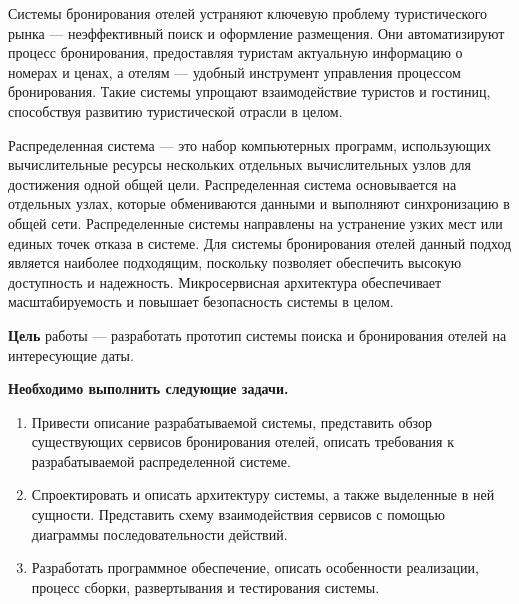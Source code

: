 {}
Системы бронирования отелей устраняют ключевую проблему туристического рынка --- неэффективный поиск и оформление размещения. Они
автоматизируют процесс бронирования, предоставляя туристам актуальную информацию о номерах и ценах, а отелям --- удобный инструмент управления
процессом бронирования. Такие системы упрощают взаимодействие туристов и гостиниц, способствуя развитию туристической отрасли в целом.

Распределенная система --- это набор компьютерных программ, использующих вычислительные ресурсы нескольких отдельных вычислительных узлов для достижения одной общей цели. Распределенная система основывается на отдельных узлах, которые обмениваются данными и выполняют синхронизацию в общей сети. Распределенные системы направлены на устранение узких мест или единых точек отказа в системе. Для системы бронирования отелей данный подход является наиболее подходящим, поскольку позволяет обеспечить высокую доступность и надежность. Микросервисная архитектура обеспечивает масштабируемость и повышает безопасность системы в целом.

\textbf{Цель} работы --- разработать прототип системы поиска и бронирования отелей на интересующие даты.

\textbf{Необходимо выполнить следующие задачи.}
\begin{enumerate}[topsep=0pt]
	\item Привести описание разрабатываемой системы, представить обзор существующих сервисов бронирования отелей, описать требования к разрабатываемой распределенной системе.
	\item Спроектировать и описать архитектуру системы, а также выделенные в ней сущности. Представить схему взаимодействия сервисов с помощью диаграммы последовательности действий.
	\item Разработать программное обеспечение, описать особенности реализации, процесс сборки, развертывания и тестирования системы.
\end{enumerate}